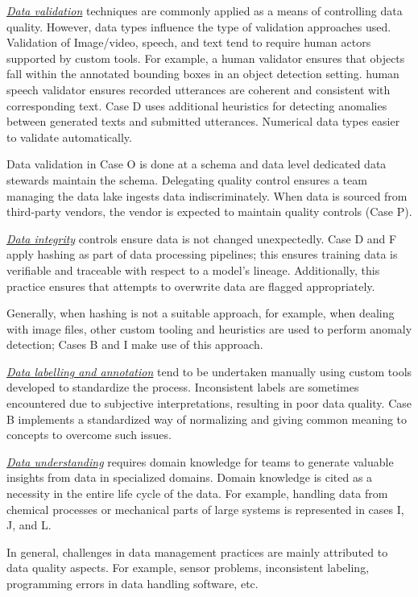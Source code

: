 \underline{\emph{Data validation}} techniques are commonly applied as a means of controlling data quality. However, data types influence the type of validation approaches used. Validation of Image/video, speech, and text tend to require human actors supported by custom tools. For example, a human validator ensures that objects fall within the annotated bounding boxes in an object detection setting. \DIFdelbegin {}\DIFdelend \DIFaddbegin {}\DIFaddend human speech validator ensures recorded utterances are coherent and consistent with corresponding text. Case D uses additional heuristics for detecting anomalies between generated texts and submitted utterances. Numerical data types \DIFdelbegin {}\DIFdelend \DIFaddbegin {}\DIFaddend easier to validate automatically.

Data validation in Case O is done at a schema and data level \DIFdelbegin {}\DIFdelend \DIFaddbegin {}\DIFaddend dedicated data stewards maintain the schema. Delegating quality control ensures a team managing the data lake ingests data indiscriminately. When data is sourced from third-party vendors, the vendor is expected to maintain quality controls (Case P).


\underline{\emph{Data integrity}}
controls ensure data is not changed unexpectedly. Case D and F apply hashing as part of data processing pipelines; this ensures training data is verifiable and traceable with respect to a model's lineage. Additionally, this practice ensures that attempts to overwrite data are flagged appropriately.

Generally, when hashing is not a suitable approach, for example, when dealing with image files, other custom tooling and heuristics are used to perform anomaly detection; Cases B and I make use of this approach.

\underline{\emph{Data labelling and annotation}} tend to be undertaken manually using custom tools developed to standardize the process. Inconsistent labels are sometimes encountered due to subjective interpretations, resulting in poor data quality. Case B implements a standardized way of normalizing and giving common meaning to concepts to overcome such issues. 

\underline{\emph{Data understanding}} requires domain knowledge for teams to generate valuable insights from data in specialized domains. Domain knowledge is cited as a necessity in the entire life cycle of the data. For example, handling data from chemical processes or mechanical parts of large systems is represented in cases I, J, and L.

In general, challenges in data management practices are mainly attributed to data quality aspects. For example, sensor problems, inconsistent labeling, programming errors in data handling software, etc.



